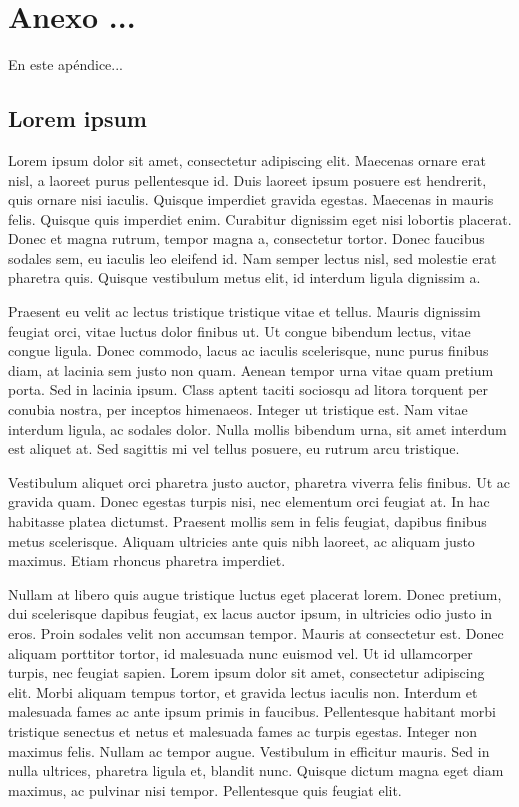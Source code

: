 \chapter{Anexo ...}

En este apéndice...


\section{Lorem ipsum}
Lorem ipsum dolor sit amet, consectetur adipiscing elit. Maecenas ornare erat nisl, a laoreet purus pellentesque id. Duis laoreet ipsum posuere est hendrerit, quis ornare nisi iaculis. Quisque imperdiet gravida egestas. Maecenas in mauris felis. Quisque quis imperdiet enim. Curabitur dignissim eget nisi lobortis placerat. Donec et magna rutrum, tempor magna a, consectetur tortor. Donec faucibus sodales sem, eu iaculis leo eleifend id. Nam semper lectus nisl, sed molestie erat pharetra quis. Quisque vestibulum metus elit, id interdum ligula dignissim a.

Praesent eu velit ac lectus tristique tristique vitae et tellus. Mauris dignissim feugiat orci, vitae luctus dolor finibus ut. Ut congue bibendum lectus, vitae congue ligula. Donec commodo, lacus ac iaculis scelerisque, nunc purus finibus diam, at lacinia sem justo non quam. Aenean tempor urna vitae quam pretium porta. Sed in lacinia ipsum. Class aptent taciti sociosqu ad litora torquent per conubia nostra, per inceptos himenaeos. Integer ut tristique est. Nam vitae interdum ligula, ac sodales dolor. Nulla mollis bibendum urna, sit amet interdum est aliquet at. Sed sagittis mi vel tellus posuere, eu rutrum arcu tristique.

Vestibulum aliquet orci pharetra justo auctor, pharetra viverra felis finibus. Ut ac gravida quam. Donec egestas turpis nisi, nec elementum orci feugiat at. In hac habitasse platea dictumst. Praesent mollis sem in felis feugiat, dapibus finibus metus scelerisque. Aliquam ultricies ante quis nibh laoreet, ac aliquam justo maximus. Etiam rhoncus pharetra imperdiet.

Nullam at libero quis augue tristique luctus eget placerat lorem. Donec pretium, dui scelerisque dapibus feugiat, ex lacus auctor ipsum, in ultricies odio justo in eros. Proin sodales velit non accumsan tempor. Mauris at consectetur est. Donec aliquam porttitor tortor, id malesuada nunc euismod vel. Ut id ullamcorper turpis, nec feugiat sapien. Lorem ipsum dolor sit amet, consectetur adipiscing elit. Morbi aliquam tempus tortor, et gravida lectus iaculis non. Interdum et malesuada fames ac ante ipsum primis in faucibus. Pellentesque habitant morbi tristique senectus et netus et malesuada fames ac turpis egestas. Integer non maximus felis. Nullam ac tempor augue. Vestibulum in efficitur mauris. Sed in nulla ultrices, pharetra ligula et, blandit nunc. Quisque dictum magna eget diam maximus, ac pulvinar nisi tempor. Pellentesque quis feugiat elit.

